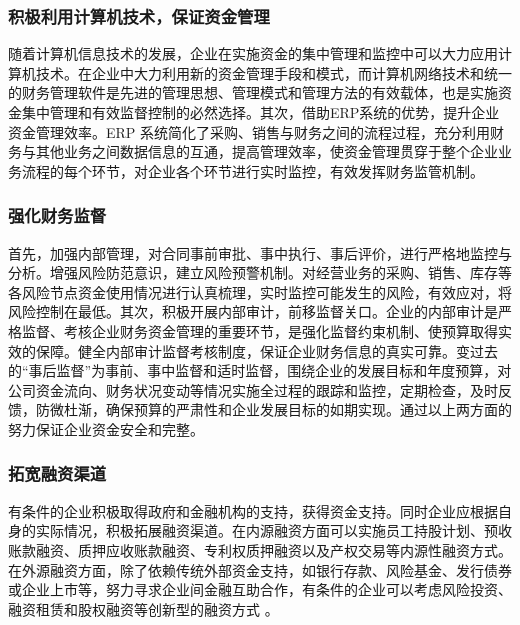     \subsubsection {积极利用计算机技术，保证资金管理}

    随着计算机信息技术的发展，企业在实施资金的集中管理和监控中可以大力应用计算机技术。在企业中大力利用新的资金管理手段和模式，而计算机网络技术和统一的财务管理软件是先进的管理思想、管理模式和管理方法的有效载体，也是实施资金集中管理和有效监督控制的必然选择。其次，借助ERP系统的优势，提升企业资金管理效率。ERP 系统简化了采购、销售与财务之间的流程过程，充分利用财务与其他业务之间数据信息的互通，提高管理效率，使资金管理贯穿于整个企业业务流程的每个环节，对企业各个环节进行实时监控，有效发挥财务监管机制。

    \subsubsection {强化财务监督}

    首先，加强内部管理，对合同事前审批、事中执行、事后评价，进行严格地监控与分析。增强风险防范意识，建立风险预警机制。对经营业务的采购、销售、库存等各风险节点资金使用情况进行认真梳理，实时监控可能发生的风险，有效应对，将风险控制在最低。其次，积极开展内部审计，前移监督关口。企业的内部审计是严格监督、考核企业财务资金管理的重要环节，是强化监督约束机制、使预算取得实效的保障。健全内部审计监督考核制度，保证企业财务信息的真实可靠。变过去的“事后监督”为事前、事中监督和适时监督，围绕企业的发展目标和年度预算，对公司资金流向、财务状况变动等情况实施全过程的跟踪和监控，定期检查，及时反馈，防微杜渐，确保预算的严肃性和企业发展目标的如期实现。通过以上两方面的努力保证企业资金安全和完整。

    \subsubsection {拓宽融资渠道}

    有条件的企业积极取得政府和金融机构的支持，获得资金支持。同时企业应根据自身的实际情况，积极拓展融资渠道。在内源融资方面可以实施员工持股计划、预收账款融资、质押应收账款融资、专利权质押融资以及产权交易等内源性融资方式。在外源融资方面，除了依赖传统外部资金支持，如银行存款、风险基金、发行债券或企业上市等，努力寻求企业间金融互助合作，有条件的企业可以考虑风险投资、融资租赁和股权融资等创新型的融资方式 。
